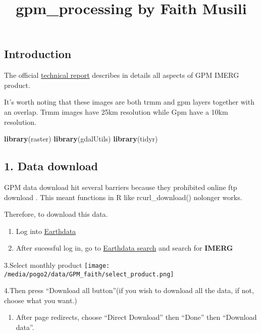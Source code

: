 \documentclass[]{article}
\title{gpm\_processing by Faith Musili}
\author{}
\date{\vspace{-2.5em}}
\newenvironment{Shaded}{\begin{snugshade}}{\end{snugshade}}
\newcommand{\KeywordTok}[1]{\textcolor[rgb]{0.13,0.29,0.53}{\textbf{#1}}}
\newcommand{\NormalTok}[1]{#1}
\providecommand{\tightlist}{%
  \setlength{\itemsep}{0pt}\setlength{\parskip}{0pt}}
\begin{document}
\maketitle

\subsection{Introduction}\label{introduction}

The official
\href{https://pmm.nasa.gov/sites/default/files/document_files/IMERG_doc_190909.pdf}{technical
report} describes in details all aspects of GPM IMERG product.

It's worth noting that these images are both trmm and gpm layers
together with an overlap. Trmm images have 25km resolution while Gpm
have a 10km resolution.

\begin{Shaded}
\begin{Highlighting}[]
\KeywordTok{library}\NormalTok{(raster)}
\KeywordTok{library}\NormalTok{(gdalUtils)}
\KeywordTok{library}\NormalTok{(tidyr)}
\end{Highlighting}
\end{Shaded}

\subsection{1. Data download}\label{data-download}

GPM data download hit several barriers because they prohibited online
ftp download . This meant functions in R like rcurl\_download() nolonger
works.

Therefore, to download this data.

\begin{enumerate}
\def\labelenumi{\arabic{enumi}.}
\item
  Log into \href{https://urs.earthdata.nasa.gov/}{Earthdata}
\item
  After sucessful log in, go to
  \href{https://search.earthdata.nasa.gov/search}{Earthdata search} and
  search for \textbf{IMERG}
\end{enumerate}

3.Select monthly product
\texttt{[image: /media/pogo2/data/GPM\_faith/select\_product.png]}

4.Then press ``Download all button''(if you wish to download all the
data, if not, choose what you want.)

\begin{enumerate}
\def\labelenumi{\arabic{enumi}.}
\setcounter{enumi}{4}
\tightlist
\item
  After page redirects, choose ``Direct Download'' then ``Done'' then
  ``Download data''.
\end{enumerate}
\end{document}
